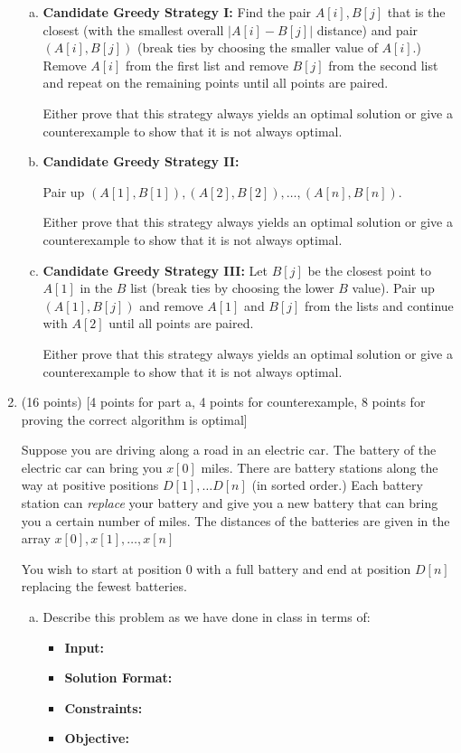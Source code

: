 \documentclass[10pt,letterpaper,unboxed,cm]{article}
\begin{document}
\begin{enumerate}
\begin{enumerate}[a)]
\item
{\bf Candidate Greedy Strategy I:} Find the pair $A[i],B[j]$ that is the closest (with the smallest overall $|A[i] - B[j]|$ distance) and pair $(A[i],B[j])$ (break ties by choosing the smaller value of $A[i]$.) Remove $A[i]$ from the first list and remove $B[j]$ from the second list and repeat on the remaining points until all points are paired.

Either prove that this strategy always yields an optimal solution or give a counterexample to show that it is not always optimal.

\item
{\bf Candidate Greedy Strategy II:}

Pair up $(A[1],B[1]), (A[2],B[2]), \dots, (A[n],B[n])$.

Either prove that this strategy always yields an optimal solution or give a counterexample to show that it is not always optimal.

\item
{\bf Candidate Greedy Strategy III:} Let $B[j]$ be the closest point to $A[1]$ in the $B$ list (break ties by choosing the lower $B$ value). Pair up $(A[1],B[j])$ and remove $A[1]$ and $B[j]$ from the lists and continue with $A[2]$ until all points are paired.

Either prove that this strategy always yields an optimal solution or give a counterexample to show that it is not always optimal.
\end{enumerate}

\item
(16 points) [4 points for part a, 4 points for counterexample, 8 points for proving the correct algorithm is optimal]

Suppose you are driving along a road in an electric car. The battery of the electric car can bring you $x[0]$ miles. There are battery stations along the way at positive positions $D[1],\dots D[n]$ (in sorted order.) Each battery station can  \emph{replace} your battery and give you a new battery that can bring you a certain number of miles. The distances of the batteries are given in the array $x[0],x[1],\dots,x[n]$

You wish to start at position $0$ with a full battery and end at position $D[n]$ replacing the fewest batteries.

\begin{enumerate}[a)]
\item
Describe this problem as we have done in class in terms of:
\begin{itemize}
\item
{\bf Input:}
\item
{\bf Solution Format:}
\item
{\bf Constraints:}
\item
{\bf Objective:} 
\end{itemize}


\end{enumerate}
\end{enumerate}
\end{document}
